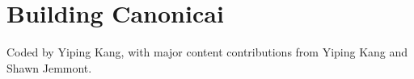\chapter{Building Canonicai}
\minitoc
Coded by Yiping Kang, with major content contributions from Yiping Kang and Shawn Jemmont.
